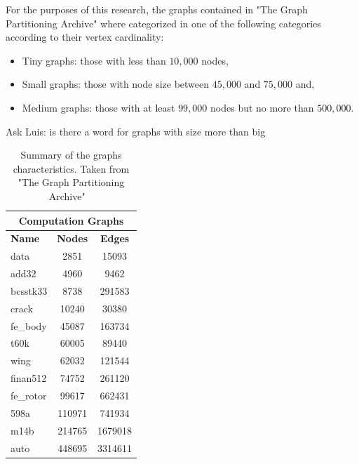 For the purposes of this research, the graphs contained in "The Graph Partitioning Archive" where categorized in one of the following categories according to their vertex cardinality: 
\begin{itemize}
    \item Tiny graphs: those with less than $10,000$ nodes,
    \item Small graphs: those with node size between $45,000$ and $75,000$ and,
    \item Medium graphs: those with at least $99,000$ nodes but no more than $500,000$.
\end{itemize}

Ask Luis: is there a word for graphs with size more than big

\begin{table}[h!]
\centering
\begin{tabular}{ |p{1.75cm}||cc|  }
\hline
\multicolumn{3}{|c|}{\textbf{Computation Graphs}} \\
\hline
\hline
\textbf{Name} & \textbf{Nodes} & \textbf{Edges} \\
\hline
data & 2851 & 15093  \\
add32 & 4960 & 9462  \\
bcsstk33 & 8738 & 291583  \\
crack & 10240 & 30380  \\
\hline
fe\_body & 45087 & 163734  \\
t60k & 60005 & 89440  \\
wing & 62032 & 121544  \\
finan512 & 74752 & 261120 \\
\hline
fe\_rotor & 99617 & 662431  \\
598a & 110971 & 741934  \\
m14b & 214765 & 1679018	 \\
auto & 448695 & 3314611  \\
\hline
\end{tabular}
\caption{\label{tab:characteristics}Summary of the graphs characteristics. Taken from "The Graph Partitioning Archive" ~\cite{archive}}
\end{table}



